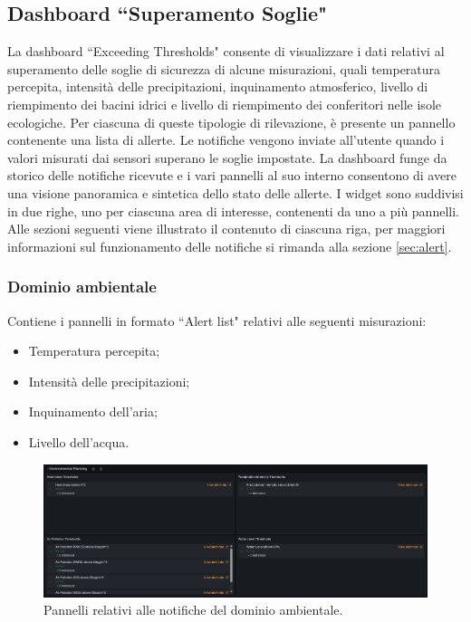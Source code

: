 \documentclass[8pt]{article}
\begin{document}
\subsection{Dashboard ``Superamento Soglie"} \label{sec:thresholds}
La dashboard ``Exceeding Thresholds" consente di visualizzare i dati relativi al superamento delle soglie di sicurezza di alcune misurazioni, quali temperatura percepita, intensità delle precipitazioni, inquinamento atmosferico, livello di riempimento dei bacini idrici e livello di riempimento dei conferitori nelle isole ecologiche. Per ciascuna di queste tipologie di rilevazione, è presente un pannello contenente una lista di allerte. Le notifiche vengono inviate all'utente quando i valori misurati dai sensori superano le soglie impostate. La dashboard funge da storico delle notifiche ricevute e i vari pannelli al suo interno consentono di avere una visione panoramica e sintetica dello stato delle allerte. I widget sono suddivisi in due righe, uno per ciascuna area di interesse, contenenti da uno a più pannelli. Alle sezioni seguenti viene illustrato il contenuto di ciascuna riga, per maggiori informazioni sul funzionamento delle notifiche si rimanda alla sezione \ref{sec:alert}.
\subsubsection{Dominio ambientale}
Contiene i pannelli in formato ``Alert list" relativi alle seguenti misurazioni:
\begin{itemize}
\setlength\itemsep{0em}
    \item Temperatura percepita;
    \item Intensità delle precipitazioni;
    \item Inquinamento dell'aria;
    \item Livello dell'acqua.
\end{itemize}
\begin{figure}[H]
    \centering
    \includegraphics[width=15cm]{images_mu/environmental_thresholds.png}
    \caption{Pannelli relativi alle notifiche del dominio ambientale.}
    \label{fig:Pannelli relativi alle notifiche del dominio ambientale}
\end{figure}
\end{document}
